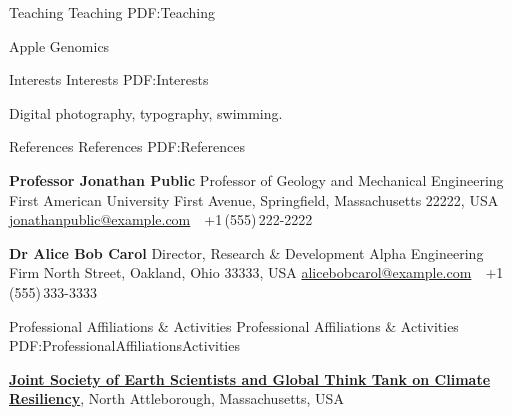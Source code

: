 \documentclass[letterpaper,MMMyyyy,nonstopmode]{simpleresumecv}
\begin{document}
\begin{Body}
{\Section
{Teaching}
{Teaching}
{PDF:Teaching}

\Gap
\BulletItem
Apple Genomics
\hfill
{}




\iffalse



\Section
{Interests}
{Interests}
{PDF:Interests}

\Entry
Digital photography,
typography,
swimming.


\Section
{References}
{References}
{PDF:References}

\BulletItem
\textbf{Professor Jonathan Public}
\newline
Professor of Geology and Mechanical Engineering
\newline
First American University
 First Avenue, Springfield, Massachusetts 22222, USA
\newline
\href{mailto:jonathanpublic@example.com}
{jonathanpublic@example.com}
\,\SubBulletSymbol\,
+1\,(555)\,222-2222

\BigGap
\BulletItem
\textbf{Dr Alice Bob Carol}
\newline
Director, Research \& Development
\newline
Alpha Engineering Firm
 North Street, Oakland, Ohio 33333, USA
\newline
\href{mailto:alicebobcarol@example.com}
{alicebobcarol@example.com}
\,\SubBulletSymbol\,
+1\,(555)\,333-3333





\Section
{Professional Affiliations\newline
\& Activities}
{Professional Affiliations \& Activities}
{PDF:ProfessionalAffiliationsActivities}

\Entry
\href{http://www.example.com/my-society}
{\textbf{Joint Society of Earth Scientists and Global Think Tank on Climate Resiliency}},
\newline
North Attleborough, Massachusetts, USA

}
\end{Body}
\end{document}
